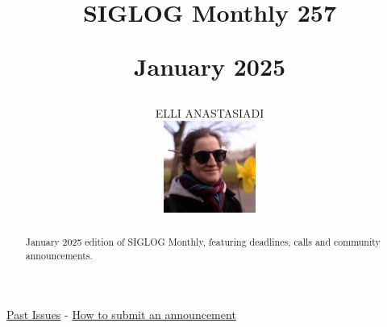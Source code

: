 \documentclass[prodmode,acmtecs]{acmsmall} %
\newcounter{colstart}
\begin{document}
\setcounter{colstart}{\thepage}

\title{{\huge\sc SIGLOG Monthly 257}

 January 2025}\author{ELLI ANASTASIADI\vspace*{-2.6cm}\begin{flushright}\includegraphics[width=30mm]{elli_anastasiadi.png}\end{flushright}}\begin{abstract}January 2025 edition of SIGLOG Monthly, featuring deadlines, calls and community announcements.
\end{abstract}


\maketitlee

\href{https://lics.siglog.org/newsletters/}{Past Issues}
 - 
\href{https://lics.siglog.org/newsletters/inst.html}{How to submit an announcement}
\end{document}
